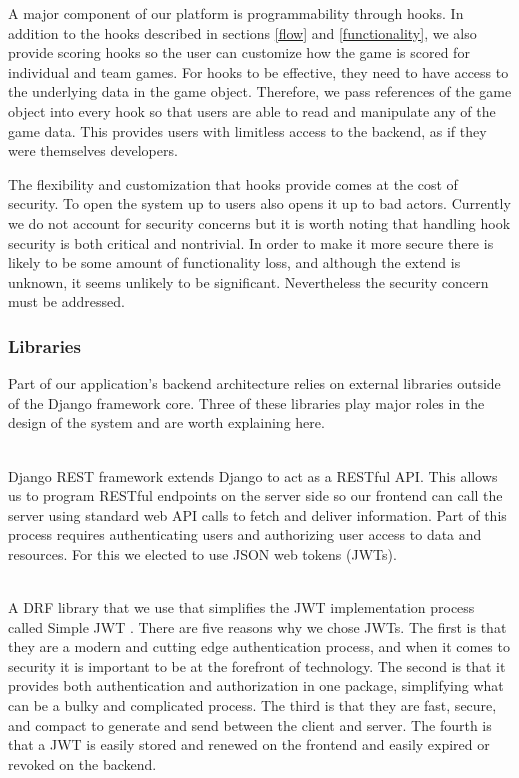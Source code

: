 \documentclass{article}
\begin{document}
            A major component of our platform is programmability through hooks. In addition to the hooks described in sections \ref{flow} and \ref{functionality}, we also provide scoring hooks so the user can customize how the game is scored for individual and team games. For hooks to be effective, they need to have access to the underlying data in the game object. Therefore, we pass references of the game object into every hook so that users are able to read and manipulate any of the game data. This provides users with limitless access to the backend, as if they were themselves developers.
            \smallskip
            
            The flexibility and customization that hooks provide comes at the cost of security. To open the system up to users also opens it up to bad actors. Currently we do not account for security concerns but it is worth noting that handling hook security is both critical and nontrivial. In order to make it more secure there is likely to be some amount of functionality loss, and although the extend is unknown, it seems unlikely to be significant. Nevertheless the security concern must be addressed.
	    
		\subsubsection{Libraries}
		    Part of our application's backend architecture relies on external libraries outside of the Django framework core. Three of these libraries play major roles in the design of the system and are worth explaining here.
            \\\\
		    \smallskip

    	    Django REST framework extends Django to act as a RESTful API. This allows us to program RESTful endpoints on the server side so our frontend can call the server using standard web API calls to fetch and deliver information. Part of this process requires authenticating users and authorizing user access to data and resources. For this we elected to use JSON web tokens (JWTs).
            \\\\
    	    \smallskip

    	    A DRF library that we use that simplifies the JWT implementation process called Simple JWT \cite{simplejwt}. There are five reasons why we chose JWTs. The first is that they are a modern and cutting edge authentication process, and when it comes to security it is important to be at the forefront of technology. The second is that it provides both authentication and authorization in one package, simplifying what can be a bulky and complicated process. The third is that they are fast, secure, and compact to generate and send between the client and server. The fourth is that a JWT is easily stored and renewed on the frontend and easily expired or revoked on the backend.
            \\\\
    	    \smallskip
	    
\end{document}
